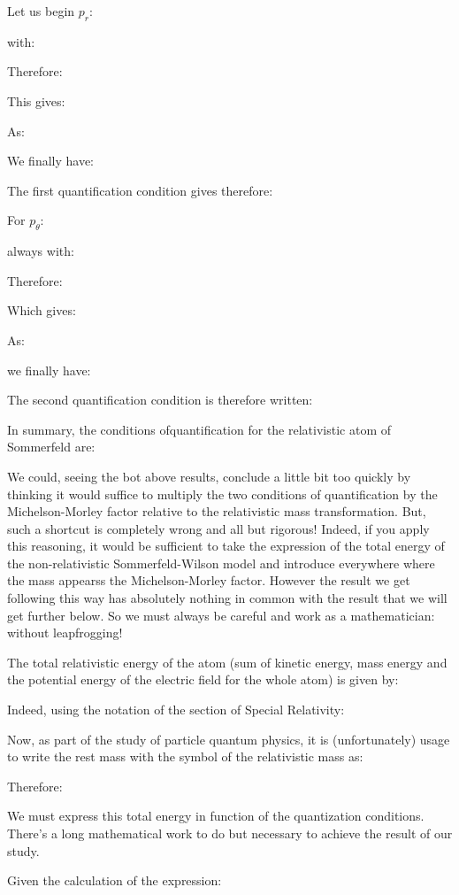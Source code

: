 	Let us begin $p_r$:
	
	with:
	
	Therefore:
	
	This gives:
	
	As:
	
	We finally have:
	
	The first quantification condition gives therefore:
	
	For $p_\theta$:
	
	always with:
	
	Therefore:
	
	Which gives:
	
	As:
	
	we finally have:
	
	The second quantification condition is therefore written:
	
	In summary, the conditions ofquantification for the relativistic atom of Sommerfeld are:
	
	We could, seeing the bot above results, conclude a little bit too quickly by thinking it would suffice to multiply the two conditions of quantification by the Michelson-Morley factor relative to the relativistic mass transformation. But, such a shortcut is completely wrong and all but rigorous! Indeed, if you apply this reasoning, it would be sufficient to take the expression of the total energy of the non-relativistic Sommerfeld-Wilson model and introduce everywhere where the mass appearss the Michelson-Morley factor. However the result we get following this way has absolutely nothing in common with the result that we will get further below. So we must always be careful and work as a mathematician: without leapfrogging!
	
	The total relativistic energy of the atom (sum of kinetic energy, mass energy  and the potential energy of the electric field for the whole atom) is given by: 
	
	Indeed, using the notation of the section of Special Relativity:
	
	Now, as part of the study of particle quantum physics, it is (unfortunately) usage to write the rest mass with the symbol of the relativistic mass as:
	
	Therefore:
	
	We must express this total energy in function of the quantization conditions. There's a long mathematical work to do but necessary to achieve the result of our study.

	Given the calculation of the expression:
	
